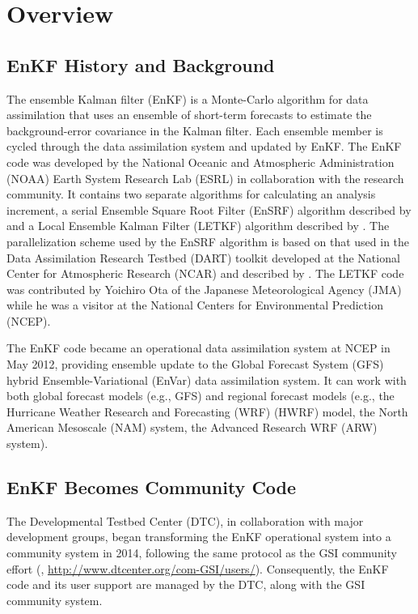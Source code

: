 \chapter{Overview}

\section{EnKF History and Background}

The ensemble Kalman filter (EnKF) is a Monte-Carlo algorithm for data assimilation that uses an ensemble of short-term forecasts to estimate the background-error covariance in the Kalman filter. Each ensemble member is cycled through the data assimilation system and updated by EnKF. The EnKF code was developed by the National Oceanic and Atmospheric Administration (NOAA) Earth System Research Lab (ESRL) in collaboration with the research community. It contains two separate algorithms for calculating an analysis increment, a serial Ensemble Square Root Filter (EnSRF) algorithm described by \cite{Whitaker2002} and a Local Ensemble Kalman Filter (LETKF) algorithm described by \cite{Hunt2007}. The parallelization scheme used by the EnSRF algorithm is based on that used in the Data Assimilation Research Testbed (DART) toolkit developed at the National Center for Atmospheric Research (NCAR) and described by \cite{Anderson2007}. The LETKF code was contributed by Yoichiro Ota of the Japanese Meteorological Agency (JMA) while he was a visitor at the National Centers for Environmental Prediction (NCEP).

The EnKF code became an operational data assimilation system at NCEP in May 2012, providing ensemble update to the Global Forecast System (GFS) hybrid Ensemble-Variational (EnVar) data assimilation system.  It can work with both global forecast models (e.g., GFS) and regional forecast models (e.g., the Hurricane Weather Research and Forecasting (WRF) (HWRF) model, the North American Mesoscale (NAM) system, the Advanced Research WRF (ARW) system).

\section{EnKF Becomes Community Code}

The Developmental Testbed Center (DTC), in collaboration with major development groups, began transforming the EnKF operational system into a community system in 2014, following the same protocol as the GSI community effort (\cite{Shao2016}, \url{http://www.dtcenter.org/com-GSI/users/}). Consequently, the EnKF code and its user support are managed by the DTC, along with the GSI community system. 

